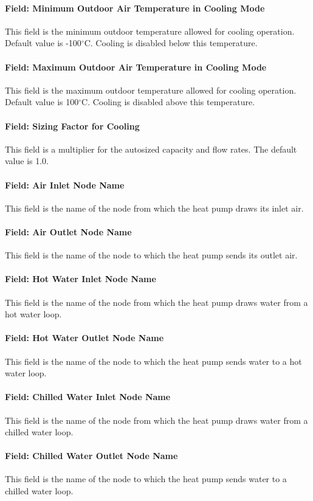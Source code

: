 \paragraph{Field: Minimum Outdoor Air Temperature in Cooling Mode} This field is
the minimum outdoor temperature allowed for cooling operation. Default value is
-100$^\circ$C. Cooling is disabled below this temperature.
\paragraph{Field: Maximum Outdoor Air Temperature in Cooling Mode} This field is
the maximum outdoor temperature allowed for cooling operation. Default value is
100$^\circ$C. Cooling is disabled above this temperature.
\paragraph{Field: Sizing Factor for Cooling} This field is a multiplier for the
autosized capacity and flow rates. The default value is 1.0.
\paragraph{Field: Air Inlet Node Name} This field is the name of the node from
which the heat pump draws its inlet air.
\paragraph{Field: Air Outlet Node Name} This field is the name of the node to
which the heat pump sends its outlet air.
\paragraph{Field: Hot Water Inlet Node Name} This field is the name of the node
from which the heat pump draws water from a hot water loop.
\paragraph{Field: Hot Water Outlet Node Name} This field is the name of the node
to which the heat pump sends water to a hot water loop.
\paragraph{Field: Chilled Water Inlet Node Name} This field is the name of the
node from which the heat pump draws water from a chilled water loop.
\paragraph{Field: Chilled Water Outlet Node Name} This field is the name of the
node to which the heat pump sends water to a chilled water loop.

